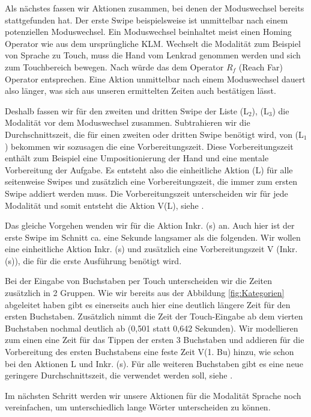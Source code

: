 Als nächstes fassen wir Aktionen zusammen, bei denen der Moduswechsel bereits stattgefunden hat. 
Der erste Swipe beispielsweise ist unmittelbar nach einem potenziellen Moduswechsel. 
Ein Moduswechsel beinhaltet meist einen Homing Operator wie aus dem ursprüngliche KLM. 
Wechselt die Modalität zum Beispiel von Sprache zu Touch, muss die Hand vom Lenkrad genommen werden und sich zum Touchbereich bewegen. 
Nach \citet{Green_2002} würde das dem Operator $R_f$ (Reach Far) Operator entsprechen. 
Eine Aktion unmittelbar nach einem Moduswechsel dauert also länger, was sich aus unseren ermittelten Zeiten auch bestätigen lässt. 

Deshalb fassen wir für den zweiten und dritten Swipe der Liste (L$_2$), (L$_3$) die Modalität vor dem Moduswechsel zusammen. Subtrahieren wir die Durchschnittszeit, die für einen zweiten oder dritten Swipe benötigt wird, von (L$_1$) bekommen wir sozusagen die eine Vorbereitungszeit. Diese Vorbereitungszeit enthält zum Beispiel eine Umpositionierung der Hand und eine mentale Vorbereitung der Aufgabe. Es entsteht also die einheitliche Aktion (L) für alle seitenweise Swipes und zusätzlich eine Vorbereitungszeit, die immer zum ersten Swipe addiert werden muss. Die Vorbereitungszeit unterscheiden wir für jede Modalität und somit entsteht die Aktion V(L), siehe .
 
Das gleiche Vorgehen wenden wir für die Aktion Inkr. (s) an. Auch hier ist der erste Swipe im Schnitt ca. eine Sekunde langsamer als die folgenden. Wir wollen eine einheitliche Aktion Inkr. (s) und zusätzlich eine Vorbereitungszeit V (Inkr. (s)), die für die erste Ausführung benötigt wird. 
 
Bei der Eingabe von Buchstaben per Touch unterscheiden wir die Zeiten zusätzlich in 2 Gruppen. 
Wie wir bereits aus der Abbildung \ref{fig:Kategorien} abgeleitet haben gibt es einerseits auch hier eine deutlich längere Zeit für den ersten Buchstaben. 
Zusätzlich nimmt die Zeit der Touch-Eingabe ab dem vierten Buchstaben nochmal deutlich ab (0,501 statt 0,642 Sekunden). 
Wir modellieren zum einen eine Zeit für das Tippen der ersten 3 Buchstaben und addieren für die Vorbereitung des ersten Buchstabens eine feste Zeit V(1. Bu) hinzu, wie schon bei den Aktionen L und Inkr. (s). 
Für alle weiteren Buchstaben gibt es eine neue geringere Durchschnittszeit, die verwendet werden soll, siehe .  

Im nächsten Schritt werden wir unsere Aktionen für die Modalität Sprache noch vereinfachen, um unterschiedlich lange Wörter unterscheiden zu können. 

